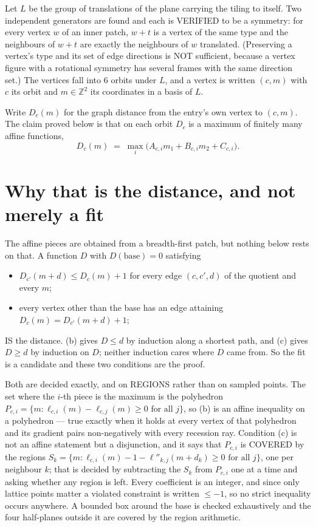 \documentclass[11pt,a4paper]{article}
\theoremstyle{plain}
\theoremstyle{definition}
\begin{document}
Let $L$ be the group of translations of the plane carrying the tiling to itself. Two
independent generators are found and each is VERIFIED to be a symmetry: for every vertex $w$
of an inner patch, $w+t$ is a vertex of the same type and the neighbours of $w+t$ are exactly
the neighbours of $w$ translated. (Preserving a vertex's type and its set of edge directions
is NOT sufficient, because a vertex figure with a rotational symmetry has several frames with
the same direction set.) The vertices fall into $6$ orbits under $L$, and a vertex is
written $(c,m)$ with $c$ its orbit and $m\in\mathbb{Z}^2$ its coordinates in a basis of $L$.

Write $D_c(m)$ for the graph distance from the entry's own vertex to $(c,m)$. The claim proved
below is that on each orbit $D_c$ is a maximum of finitely many affine functions,
\[
D_c(m)\;=\;\max_i\bigl(A_{c,i}m_1+B_{c,i}m_2+C_{c,i}\bigr).
\]

\section{Why that is the distance, and not merely a fit}

The affine pieces are obtained from a breadth-first patch, but nothing below rests on that. A
function $D$ with $D(\text{base})=0$ satisfying

\begin{itemize}
\item[(b)] $D_{c'}(m+d)\le D_c(m)+1$ for every edge $(c,c',d)$ of the quotient and every $m$;
\item[(c)] every vertex other than the base has an edge attaining $D_c(m)=D_{c'}(m+d)+1$;
\end{itemize}

IS the distance. (b) gives $D\le d$ by induction along a shortest path, and (c) gives $D\ge d$
by induction on $D$; neither induction cares where $D$ came from. So the fit is a candidate and
these two conditions are the proof.

Both are decided exactly, and on REGIONS rather than on sampled points. The set where the
$i$-th piece is the maximum is the polyhedron
$P_{c,i}=\{m: \ell_{c,i}(m)-\ell_{c,j}(m)\ge0 \text{ for all } j\}$, so (b) is an
affine inequality on a polyhedron --- true exactly when it holds at every vertex of that
polyhedron and its gradient pairs non-negatively with every recession ray. Condition (c) is
not an affine statement but a disjunction, and it says that $P_{c,i}$ is COVERED by the
regions
$S_k=\{m:\ell_{c,i}(m)-1-\ell''_{k,j}(m+d_k)\ge0\text{ for all }j\}$, one per
neighbour $k$; that is decided by subtracting the $S_k$ from $P_{c,i}$ one at a time and
asking whether any region is left. Every coefficient is an integer, and since only lattice
points matter a violated constraint is written $\le-1$, so no strict inequality occurs
anywhere. A bounded box around the base is checked exhaustively and the four half-planes
outside it are covered by the region arithmetic.
\end{document}

